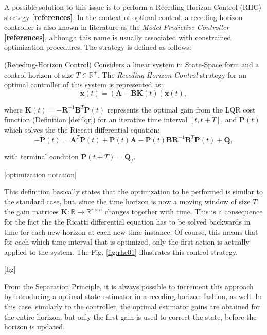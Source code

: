 \documentclass[a4paper,11pt]{book}
\numberwithin{figure}{chapter}
\numberwithin{equation}{chapter}
\numberwithin{table}{chapter}
\theoremstyle{definition}
\newtheorem{definition}{Definition}[chapter]
\newcounter{boxed-theorem}
\newcounter{boxed-definition}
\newenvironment{boxed-definition}[1]
{\begin{shaded} \begin{definition}{#1}}
{\end{definition} \end{shaded}}
\begin{document}
A possible solution to this issue is to perform a Receding Horizon Control (RHC) strategy \textbf{[references]}. In the context of optimal control, a receding horizon controller is also known in literature as the \textit{Model-Predictive Controller} \textbf{[references]}, although this name is usually associated with constrained optimization procedures. The strategy is defined as follows:

\begin{boxed-definition}{(Receding-Horizon Control)} \label{def:recedingHorizon}
	Considers a linear system in State-Space form and a control horizon of size $T \in \mathbb{R}^+$. The \textit{Receding-Horizon Control} strategy for an optimal controller of this system is represented as:
	\begin{equation}
        \dot{\bm{x}}(t) = \left( \bm{A} - \bm{B} \bm{K}(t) \right) \bm{x}(t)
    ,\end{equation} 
    
	\noindent where $\bm{K}(t) = - \bm{R}^{-1} \bm{B}^T \bm{P}(t)$ represents the optimal gain from the LQR cost function (Definition \ref{def:lqr}) for an iterative time interval $[t, t+T]$, and $\bm{P}(t)$ which solves the the Riccati differential equation:
    \begin{equation}
        -\dot{\bm{P}}(t) = \bm{A}^T \bm{P}(t) + \bm{P}(t) \bm{A} - \bm{P}(t) \bm{B} \bm{R}^{-1} \bm{B}^T \bm{P}(t) + \bm{Q}
    ,\end{equation}
    
    \noindent with terminal condition $\bm{P}(t+T) = \bm{Q}_f$.
\end{boxed-definition}

[optimization notation]

This definition basically states that the optimization to be performed is similar to the standard case, but, since the time horizon is now a moving window of size $T$, the gain matrices $\bm{K} : \mathbb{R} \rightarrow \mathbb{R}^{r \times n}$ changes together with time. This is a consequence for the fact the the Ricatti differential equation has to be solved backwards in time for each new horizon at each new time instance. Of course, this means that for each which time interval that is optimized, only the first action is actually applied to the system. The Fig. \ref{fig:rhc01} illustrates this control strategy.

[fig]

From the Separation Principle, it is always possible to increment this approach by introducing a optimal state estimator in a receding horizon fashion, as well. In this case, similarly to the controller, the optimal estimator gains are obtained for the entire horizon, but only the first gain is used to correct the state, before the horizon is updated.
\end{document}
